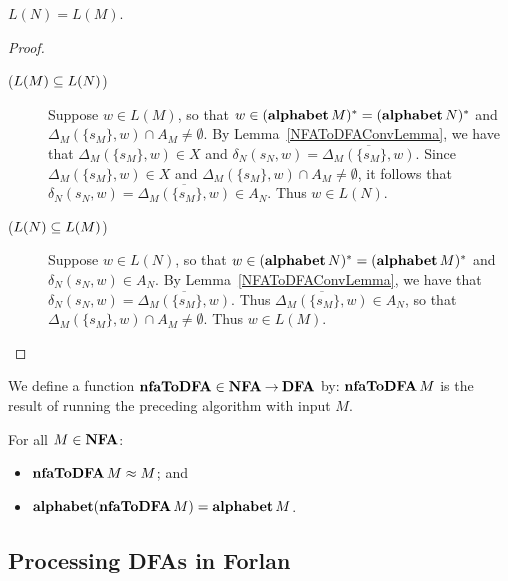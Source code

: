 \begin{lemma}
$L(N)=L(M)$.
\end{lemma}

\begin{proof}
\begin{description}
\item[\quad($L(M)\subseteq L(N)$)] Suppose $w\in L(M)$, so that
  $w\in(\mathbf{alphabet}\,M)^*=(\mathbf{alphabet}\,N)^*$ and $\Delta_M(\{s_M\},w)\cap
  A_M\neq\emptyset$.  By Lemma~\ref{NFAToDFAConvLemma}, we have that
  $\Delta_M(\{s_M\},w)\in X$ and
  $\delta_N(s_N,w)=\overline{\Delta_M(\{s_M\},w)}$.  Since
  $\Delta_M(\{s_M\},w)\in X$ and $\Delta_M(\{s_M\},w)\cap
  A_M\neq\emptyset$, it follows that
  $\delta_N(s_N,w)=\overline{\Delta_M(\{s_M\},w)} \in A_N$.  Thus
  $w\in L(N)$.

\item[\quad($L(N)\subseteq L(M)$)] Suppose $w\in L(N)$, so that
  $w\in(\mathbf{alphabet}\,N)^*=(\mathbf{alphabet}\,M)^*$ and $\delta_N(s_N,w)\in
  A_N$.  By Lemma~\ref{NFAToDFAConvLemma}, we have that
  $\delta_N(s_N,w)= \overline{\Delta_M(\{s_M\},w)}$.  Thus
  $\overline{\Delta_M(\{s_M\},w)}\in A_N$, so that
  $\Delta_M(\{s_M\},w)\cap A_M\neq\emptyset$.  Thus $w\in L(M)$.
\end{description}
\end{proof}

%
%
We define a function $\mathbf{nfaToDFA}\in\mathbf{NFA}\mathbin{\to}\mathbf{DFA}$ by: $\mathbf{nfaToDFA}\,M$ is
the result of running the preceding algorithm with input $M$.

\begin{theorem}
\label{NFAToDFATheorem}
For all $M\in\mathbf{NFA}$:
\begin{itemize}
\item $\mathbf{nfaToDFA}\,M\approx M$; and

\item $\mathbf{alphabet}(\mathbf{nfaToDFA}\,M)=\mathbf{alphabet}\,M$.
\end{itemize}
\end{theorem}

\subsection{Processing DFAs in Forlan}

